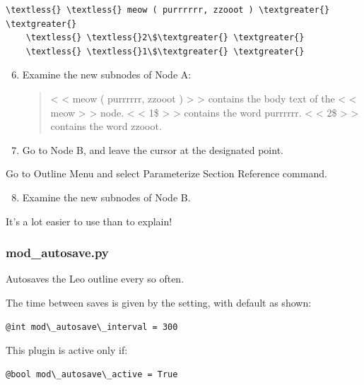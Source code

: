 \documentclass[a4paper,10pt,english]{sphinxmanual}
\begin{document}
\begin{Verbatim}[commandchars=\\\{\}]
\textless{} \textless{} meow ( purrrrrr, zzooot ) \textgreater{} \textgreater{}
    \textless{} \textless{}2\$\textgreater{} \textgreater{}
    \textless{} \textless{}1\$\textgreater{} \textgreater{}
\end{Verbatim}
\begin{enumerate}
\setcounter{enumi}{5}
\item {} 
Examine the new subnodes of Node A:
\begin{quote}

\textless{} \textless{} meow ( purrrrrr, zzooot ) \textgreater{} \textgreater{} contains the body text of the \textless{} \textless{} meow \textgreater{} \textgreater{} node.
\textless{} \textless{} 1\$ \textgreater{} \textgreater{} contains the word purrrrrr.
\textless{} \textless{} 2\$ \textgreater{} \textgreater{} contains the word zzooot.
\end{quote}

\item {} 
Go to Node B, and leave the cursor at the designated point.

\end{enumerate}

Go to Outline Menu and select Parameterize Section Reference command.
\begin{enumerate}
\setcounter{enumi}{7}
\item {} 
Examine the new subnodes of Node B.

\end{enumerate}

It's a lot easier to use than to explain!


\subsubsection{mod\_autosave.py}
\label{plugins:mod-autosave-py}
Autosaves the Leo outline every so often.

The time between saves is given by the setting, with default as shown:

\begin{Verbatim}[commandchars=\\\{\}]
@int mod\_autosave\_interval = 300
\end{Verbatim}

This plugin is active only if:

\begin{Verbatim}[commandchars=\\\{\}]
@bool mod\_autosave\_active = True
\end{Verbatim}
\end{document}
